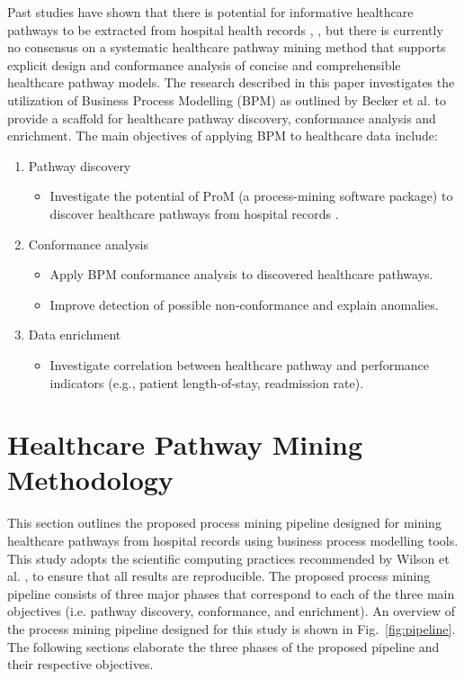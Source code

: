 Past studies have shown that there is potential for informative healthcare pathways to be extracted from hospital health records \cite{Xu2017}, \cite{Iwata2013}, but there is currently no consensus on a systematic healthcare pathway mining method that supports explicit design and conformance analysis of concise and comprehensible healthcare pathway models. The research described in this paper investigates the utilization of Business Process Modelling (BPM) as outlined by Becker et al. \cite{Becker2000} to provide a scaffold for healthcare pathway discovery, conformance analysis and enrichment. The main objectives of applying BPM to healthcare data include:
\begin{enumerate}
    \item Pathway discovery
    \begin{itemize}
        \item Investigate the potential of ProM (a process-mining software package) to discover healthcare pathways from hospital records \cite{VanDongen2005}.
    \end{itemize}
    \item Conformance analysis
    \begin{itemize}
        \item Apply BPM conformance analysis to discovered healthcare pathways. 
        \item Improve detection of possible non-conformance and explain anomalies.
    \end{itemize}
    \item Data enrichment
    \begin{itemize}
        \item Investigate correlation between healthcare pathway and performance indicators (e.g., patient length-of-stay, readmission rate).
    \end{itemize}
\end{enumerate}

\section{Healthcare Pathway Mining Methodology}
This section outlines the proposed process mining pipeline designed for mining healthcare pathways from hospital records using business process modelling tools. This study adopts the scientific computing practices recommended by Wilson et al. \cite{Wilson2014}, \cite{Wilson2017} to ensure that all results are reproducible. The proposed process mining pipeline consists of three major phases that correspond to each of the three main objectives (i.e. pathway discovery, conformance, and enrichment). An overview of the process mining pipeline designed for this study is shown in Fig.~\ref{fig:pipeline}.  The following sections elaborate the three phases of the proposed pipeline and their respective objectives.


